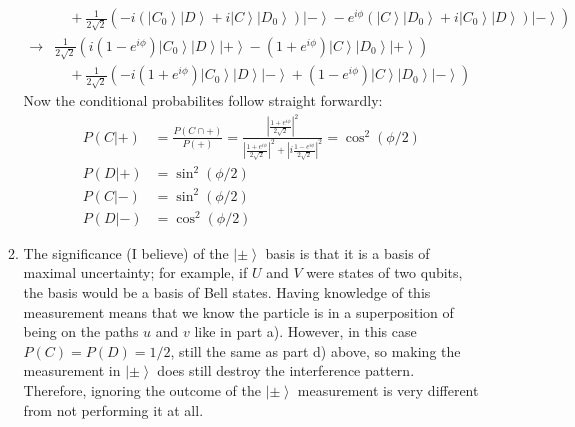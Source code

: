 \documentclass[12pt,a4]{article}
\begin{document}
\begin{enumerate}
\begin{enumerate}
\begin{align*}
              & \quad + \frac{1}{2\sqrt{2}} \left(-i\left(\left| C_0 \right \rangle \left| D \right \rangle + i \left| C \right \rangle \left| D_0 \right \rangle\right) \left| - \right \rangle - e^{i \phi}\left( \left| C \right \rangle\left| D_0 \right \rangle + i\left| C_0 \right \rangle \left| D \right \rangle \right) \left| - \right \rangle \right) \\
          \to & \frac{1}{2\sqrt{2}} \left(i(1 - e^{i\phi}) \left| C_0 \right \rangle \left| D \right \rangle \left| + \right \rangle - (1 + e^{i \phi}) \left| C \right \rangle \left| D_0 \right \rangle \left| + \right \rangle \right) \\
              & \quad + \frac{1}{2\sqrt{2}} \left(-i(1 + e^{i\phi})\left| C_0 \right \rangle \left| D \right \rangle \left| - \right \rangle + (1 - e^{i\phi}) \left| C \right \rangle \left| D_0 \right \rangle \left| - \right \rangle\right) 
        \end{align*}
        Now the conditional probabilites follow straight forwardly:
        \begin{align*}
          P(C | +) &= \frac{P(C \cap +)}{P(+)} = \frac{\left|\frac{1 + e^{i \phi}}{2\sqrt{2}}\right|^2}{\left|\frac{1 + e^{i \phi}}{2\sqrt{2}}\right|^2 + \left|i\frac{1 - e^{i \phi}}{2\sqrt{2}}\right|^2} = \cos^2(\phi / 2)\\
          P(D | +) &= \sin^2(\phi / 2)\\
          P(C | -) &= \sin^2(\phi / 2)\\
          P(D | -) &= \cos^2(\phi / 2)
        \end{align*}
      \item
        The significance (I believe) of the $\left| \pm \right\rangle$ basis is that it is a basis of maximal uncertainty; for example, if $U$ and $V$ were states of two qubits, the basis would be a basis of Bell states.
        Having knowledge of this measurement means that we know the particle is in a superposition of being on the paths $u$ and $v$ like in part a).
        However, in this case $P(C) = P(D) = 1/2$, still the same as part d) above, so making the measurement in $\left|\pm\right\rangle$ does still destroy the interference pattern.
        Therefore, ignoring the outcome of the $\left| \pm \right\rangle$ measurement is very different from not performing it at all.

\end{enumerate}
\end{enumerate}
\end{document}
